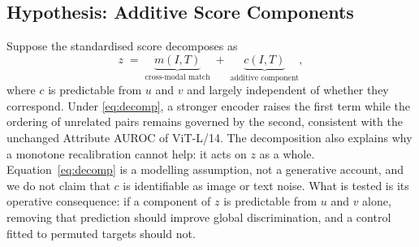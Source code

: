 \subsection{Hypothesis: Additive Score Components}
Suppose the standardised score decomposes as
\begin{equation}
  z \;=\; \underbrace{m(I,T)}_{\text{cross-modal match}} \;+\;
         \underbrace{c(I,T)}_{\text{additive component}},
  \label{eq:decomp}
\end{equation}
where $c$ is predictable from $u$ and $v$ and largely independent of whether they
correspond. Under \eqref{eq:decomp}, a stronger encoder raises the first term while
the ordering of unrelated pairs remains governed by the second, consistent with the
unchanged Attribute AUROC of ViT-L/14. The decomposition also explains why a monotone
recalibration cannot help: it acts on $z$ as a whole. Equation~\eqref{eq:decomp} is a
modelling assumption, not a generative account, and we do not claim that $c$ is
identifiable as image or text noise. What is tested is its operative consequence: if
a component of $z$ is predictable from $u$ and $v$ alone, removing that prediction
should improve global discrimination, and a control fitted to permuted targets
should not.
